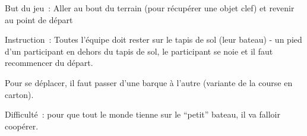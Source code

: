 \documentclass{grand-jeu}
\begin{document}
\begin{liste-materiel}
\end{liste-materiel}

\begin{regles}
But du jeu : Aller au bout du terrain (pour récupérer une objet clef) et revenir au point de départ

\vspace{0.2cm}
Instruction : Toutes l’équipe doit rester sur le tapis de sol (leur bateau) - un pied d’un participant en dehors du tapis de sol, le participant se noie et il faut recommencer du départ.

Pour se déplacer, il faut passer d’une barque à l’autre (variante de la course en carton).

\vspace{0.2cm}
Difficulté : pour que tout le monde tienne sur le “petit” bateau, il va falloir coopérer.
\end{regles}

\begin{imaginaire}

\end{imaginaire}

\begin{moments-stop}
\end{moments-stop}
\end{document}
